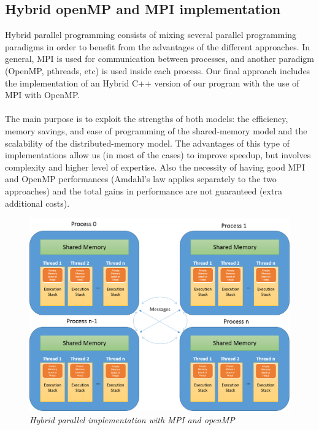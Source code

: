 \documentclass[12pt]{article}
\begin{document}
\subsection{Hybrid openMP and MPI implementation}

Hybrid parallel programming consists of mixing several parallel programming paradigms in order to benefit from the advantages of the different approaches. In general, MPI is used for communication between processes, and another paradigm (OpenMP, pthreads, etc) is used inside each process. Our final approach includes the implementation of an Hybrid C++ version of our program with the use of MPI with OpenMP.
\\\\
The main purpose is to exploit the strengths of both models: the efficiency, memory savings, and ease of programming of the shared-memory model and the scalability of the distributed-memory model. The advantages of this type of implementations allow us (in most of the cases) to improve speedup, but involves complexity and higher level of expertise. Also the necessity of having good MPI and OpenMP performances (Amdahl's law applies separately to the two approaches) and the total gains in performance are not guaranteed (extra additional costs)\cite{HybridP}.

	\begin{figure}[h!]
    \includegraphics[scale=0.6]{HybridArchitecture.png}
    \centering
    \caption{\textit{Hybrid parallel implementation with MPI and openMP}}
    \label{fig:hybridarch}
	\end{figure}
	
\end{document}
